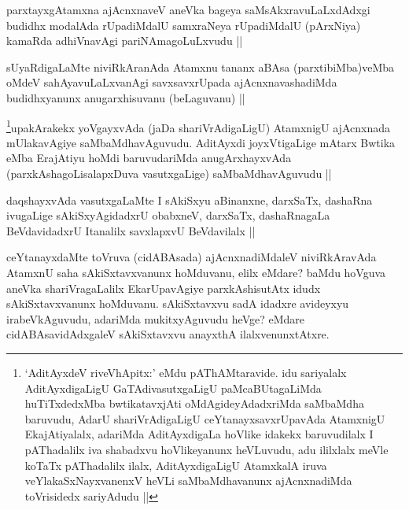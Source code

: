 \begin{artha}
parxtayxgAtamxna ajAcnxnaveV aneVka bageya saMsAkxravuLaLxdAdxgi budidhx modalAda rUpadiMdalU samxraNeya rUpadiMdalU (pArxNiya) kamaRda adhiVnavAgi pariNAmagoLuLxvudu ||
\end{artha}

\begin{artha}
sUyaRdigaLaMte niviRkAranAda Atamxnu tananx aBAsa (parxtibiMba)veMba oMdeV sahAyavuLaLxvanAgi savxsavxrUpada ajAcnxnavashadiMda budidhxyanunx anugarxhisuvanu (beLaguvanu) ||
\end{artha}

\begin{artha}
\footnote{`AditAyxdeV riveVhApitx:' eMdu pAThAMtaravide. idu sariyalalx AditAyxdigaLigU GaTAdivasutxgaLigU paMcaBUtagaLiMda huTiTxdedxMba bwtikatavxjAti oMdAgideyAdadxriMda saMbaMdha baruvudu, AdarU shariVrAdigaLigU ceYtanayxsavxrUpavAda AtamxnigU EkajAtiyalalx, adariMda AditAyxdigaLa hoVlike idakekx baruvudilalx I pAThadalilx iva shabadxvu hoVlikeyanunx heVLuvudu, adu ililxlalx meVle koTaTx pAThadalilx ilalx, AditAyxdigaLigU AtamxkalA iruva veYlakaSxNayxvanenxV heVLi saMbaMdhavanunx ajAcnxnadiMda toVrisidedx sariyAdudu ||}upakArakekx yoVgayxvAda (jaDa shariVrAdigaLigU) AtamxnigU ajAcnxnada mUlakavAgiye saMbaMdhavAguvudu. AditAyxdi joyxVtigaLige mAtarx Bwtika eMba ErajAtiyu hoMdi baruvudariMda anugArxhayxvAda (parxkAshagoLisalapxDuva vasutxgaLige) saMbaMdhavAguvudu ||
\end{artha}

\begin{artha}
daqshayxvAda vasutxgaLaMte I sAkiSxyu aBinanxne, darxSaTx, dashaRna ivugaLige sAkiSxyAgidadxrU obabxneV, darxSaTx, dashaRnagaLa BeVdavidadxrU Itanalilx savxlapxvU BeVdavilalx ||
\end{artha}

\begin{artha}
ceYtanayxdaMte toVruva (cidABAsada) ajAcnxnadiMdaleV niviRkAravAda AtamxnU saha sAkiSxtavxvanunx hoMduvanu, elilx eMdare? baMdu hoVguva aneVka shariVragaLalilx EkarUpavAgiye parxkAshisutAtx idudx sAkiSxtavxvanunx hoMduvanu. sAkiSxtavxvu sadA idadxre avideyxyu irabeVkAguvudu, adariMda mukitxyAguvudu heVge? eMdare cidABAsavidAdxgaleV sAkiSxtavxvu anayxthA ilalxvenunxtAtxre. 
\end{artha}

